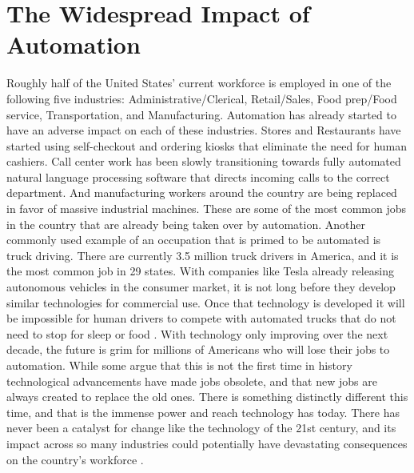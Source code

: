 \documentclass{article}
\begin{document}
\section{The Widespread Impact of Automation}
Roughly half of the United States’ current workforce is employed in one of the following five industries: Administrative/Clerical, Retail/Sales, Food prep/Food service, Transportation, and Manufacturing. Automation has already started to have an adverse impact on each of these industries. Stores and Restaurants have started using self-checkout and ordering kiosks that eliminate the need for human cashiers. Call center work has been slowly transitioning towards fully automated natural language processing software that directs incoming calls to the correct department. And manufacturing workers around the country are being replaced in favor of massive industrial machines. These are some of the most common jobs in the country that are already being taken over by automation. Another commonly used example of an occupation that is primed to be automated is truck driving. There are currently 3.5 million truck drivers in America, and it is the most common job in 29 states. With companies like Tesla already releasing autonomous vehicles in the consumer market, it is not long before they develop similar technologies for commercial use. Once that technology is developed it will be impossible for human drivers to compete with automated trucks that do not need to stop for sleep or food \cite{rogan_2019}. With technology only improving over the next decade, the future is grim for millions of Americans who will lose their jobs to automation. While some argue that this is not the first time in history technological advancements have made jobs obsolete, and that new jobs are always created to replace the old ones. There is something distinctly different this time, and that is the immense power and reach technology has today. There has never been a catalyst for change like the technology of the 21st century, and its impact across so many industries could potentially have devastating consequences on the country's workforce \cite{the_social_dilemma_2020}.
\end{document}

